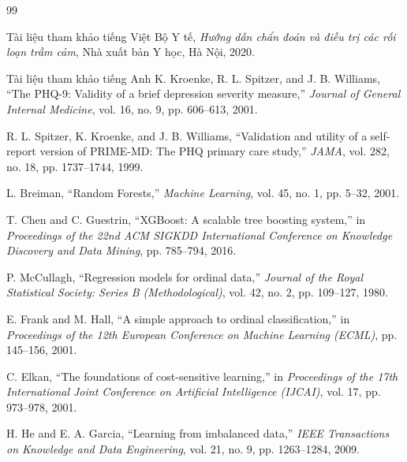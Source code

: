 \documentclass{uetgraduation}
\begin{document}
\begin{thebibliography}{99}

\begin{bibsection}{Tài liệu tham khảo tiếng Việt}
    Bộ Y tế,
    \textit{Hướng dẫn chẩn đoán và điều trị các rối loạn trầm cảm},
    Nhà xuất bản Y học, Hà Nội, 2020.
\end{bibsection}

\begin{bibsection}{Tài liệu tham khảo tiếng Anh}
    K. Kroenke, R. L. Spitzer, and J. B. Williams,
    ``The {PHQ-9}: Validity of a brief depression severity measure,''
    \textit{Journal of General Internal Medicine}, vol. 16, no. 9, pp. 606--613, 2001.

    R. L. Spitzer, K. Kroenke, and J. B. Williams,
    ``Validation and utility of a self-report version of {PRIME-MD}: The {PHQ} primary care study,''
    \textit{JAMA}, vol. 282, no. 18, pp. 1737--1744, 1999.

    L. Breiman,
    ``Random Forests,''
    \textit{Machine Learning}, vol. 45, no. 1, pp. 5--32, 2001.

    T. Chen and C. Guestrin,
    ``{XGBoost}: A scalable tree boosting system,''
    in \textit{Proceedings of the 22nd ACM SIGKDD International Conference on Knowledge Discovery and Data Mining}, pp. 785--794, 2016.

    P. McCullagh,
    ``Regression models for ordinal data,''
    \textit{Journal of the Royal Statistical Society: Series B (Methodological)}, vol. 42, no. 2, pp. 109--127, 1980.

    E. Frank and M. Hall,
    ``A simple approach to ordinal classification,''
    in \textit{Proceedings of the 12th European Conference on Machine Learning (ECML)}, pp. 145--156, 2001.

    C. Elkan,
    ``The foundations of cost-sensitive learning,''
    in \textit{Proceedings of the 17th International Joint Conference on Artificial Intelligence (IJCAI)}, vol. 17, pp. 973--978, 2001.

    H. He and E. A. Garcia,
    ``Learning from imbalanced data,''
    \textit{IEEE Transactions on Knowledge and Data Engineering}, vol. 21, no. 9, pp. 1263--1284, 2009.


\end{bibsection}
\end{thebibliography}
\end{document}
